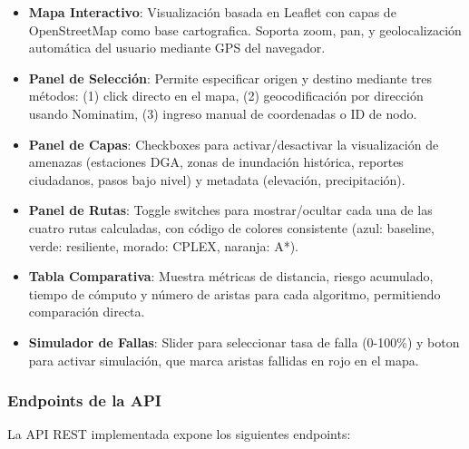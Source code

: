 \documentclass[conference]{IEEEtran}
\begin{document}
\begin{itemize}
    \item \textbf{Mapa Interactivo}: Visualización basada en Leaflet con capas de OpenStreetMap como base cartografica. Soporta zoom, pan, y geolocalización automática del usuario mediante GPS del navegador.

    \item \textbf{Panel de Selección}: Permite especificar origen y destino mediante tres métodos: (1) click directo en el mapa, (2) geocodificación por dirección usando Nominatim, (3) ingreso manual de coordenadas o ID de nodo.

    \item \textbf{Panel de Capas}: Checkboxes para activar/desactivar la visualización de amenazas (estaciones DGA, zonas de inundación histórica, reportes ciudadanos, pasos bajo nivel) y metadata (elevación, precipitación).

    \item \textbf{Panel de Rutas}: Toggle switches para mostrar/ocultar cada una de las cuatro rutas calculadas, con código de colores consistente (azul: baseline, verde: resiliente, morado: CPLEX, naranja: A*).

    \item \textbf{Tabla Comparativa}: Muestra métricas de distancia, riesgo acumulado, tiempo de cómputo y número de aristas para cada algoritmo, permitiendo comparación directa.

    \item \textbf{Simulador de Fallas}: Slider para seleccionar tasa de falla (0-100\%) y boton para activar simulación, que marca aristas fallidas en rojo en el mapa.
\end{itemize}

\subsubsection{Endpoints de la API}

La API REST implementada expone los siguientes endpoints:
\end{document}
